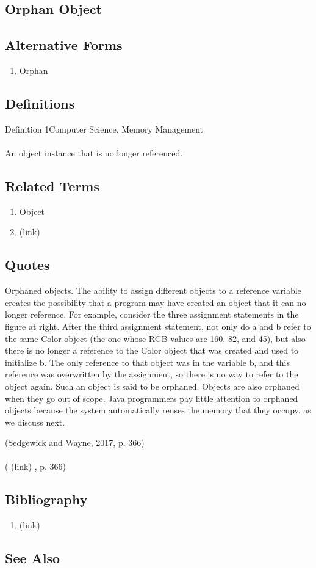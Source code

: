 \newpage \subsection*{Orphan Object } \subsection*{Alternative Forms } \begin{enumerate} \item  Orphan  \end{enumerate} \subsection*{Definitions } \begin{DIC_Def}{Definition 1Computer Science, Memory Management }{} \paragraph{} An object instance that is no longer referenced.  \end{DIC_Def} \subsection*{Related Terms } \begin{enumerate} \item  Object  \item  (link) \href{Orphan (Dictionary Entry) }{ }   \end{enumerate} \subsection*{Quotes } \begin{DIC_BlockQuote} Orphaned objects. The ability to assign different objects to a reference variable creates the possibility that a program may have created an object that it can no longer reference. For example, consider the three assignment statements in the ﬁgure at right. After the third assignment statement, not only do a and b refer to the same Color object (the one whose RGB values are 160, 82, and 45), but also there is no longer a reference to the Color object that was created and used to initialize b. The only reference to that object was in the variable b, and this reference was overwritten by the assignment, so there is no way to refer to the object again. Such an object is said to be orphaned. Objects are also orphaned when they go out of scope. Java programmers pay little attention to orphaned objects because the system automatically reuses the memory that they occupy, as we discuss next.  \end{DIC_BlockQuote} (Sedgewick and Wayne, 2017, p. 366)  \paragraph{} (  (link) \href{Sedgewick and Wayne, 2017 }{ } , p. 366)  \subsection*{Bibliography } \begin{enumerate} \item  (link) \href{Sedgewick and Wayne, 2017 }{ }   \end{enumerate} \subsection*{See Also } 